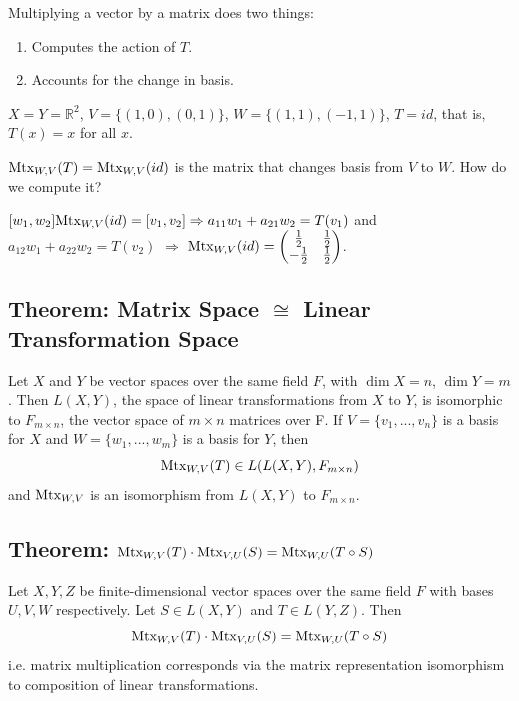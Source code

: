 \documentclass[11pt]{elegantbook}
\begin{document}
Multiplying a vector by a matrix does two things:
\begin{enumerate}
    \item Computes the action of $T$.
    \item Accounts for the change in basis.
\end{enumerate}

\begin{example}
    $X = Y = \mathbb{R}^2$, $V = \{(1, 0),(0, 1)\}$, $W = \{(1, 1),(-1, 1)\}$, $T = id$, that is, $T (x) = x$ for all $x$.

    $\textnormal{Mtx}_{W,V}(T)=\textnormal{Mtx}_{W,V}(id)$ is the matrix that changes basis from $V$ to $W$. How do we compute it?

    $[w_1,w_2] \textnormal{Mtx}_{W,V}(id)= [v_1,v_2] \Rightarrow  a_{11}w_1+a_{21}w_2=T(v_1)$ and $a_{12}w_1+a_{22}w_2=T(v_2)$ $\Rightarrow$ $\textnormal{Mtx}_{W,V}(id)=\begin{pmatrix}
        \frac{1}{2}&\frac{1}{2}\\
        -\frac{1}{2}&\frac{1}{2}
    \end{pmatrix}$.
\end{example}


\subsection{Theorem: Matrix Space $\cong$ Linear Transformation Space}
\begin{theorem}
    Let $X$ and $Y$ be vector spaces over the same field $F$, with $\dim X = n$, $\dim Y = m$. Then $L(X, Y)$, the space of linear transformations from $X$ to $Y$, is isomorphic to $F_{m\times n}$, the vector space of $m\times n$ matrices over F. If $V = \{v_1, . . . , v_n\}$ is a basis for $X$ and $W = \{w_1, . . . , w_m\}$ is a basis for $Y$, then
    $$\textnormal{Mtx}_{W,V}(T)\in L(L(X,Y),F_{m\times n})$$
    and $\textnormal{Mtx}_{W,V}$ is an isomorphism from $L(X, Y)$ to $F_{m\times n}$.
\end{theorem}

\subsection{Theorem: $\textnormal{Mtx}_{W,V}(T)\cdot \textnormal{Mtx}_{V,U}(S)=\textnormal{Mtx}_{W,U}(T\circ S)$}
\begin{theorem}[$\textnormal{Mtx}_{W,V}(T)\cdot \textnormal{Mtx}_{V,U}(S)=\textnormal{Mtx}_{W,U}(T\circ S)$]
    Let $X, Y, Z$ be finite-dimensional vector spaces over the same field $F$ with bases $U, V, W$ respectively. Let $S \in L(X, Y)$ and $T \in L(Y, Z)$. Then
    $$\textnormal{Mtx}_{W,V}(T)\cdot \textnormal{Mtx}_{V,U}(S)=\textnormal{Mtx}_{W,U}(T\circ S)$$
    i.e. matrix multiplication corresponds via the matrix representation isomorphism to composition of linear transformations.
\end{theorem}
\end{document}
